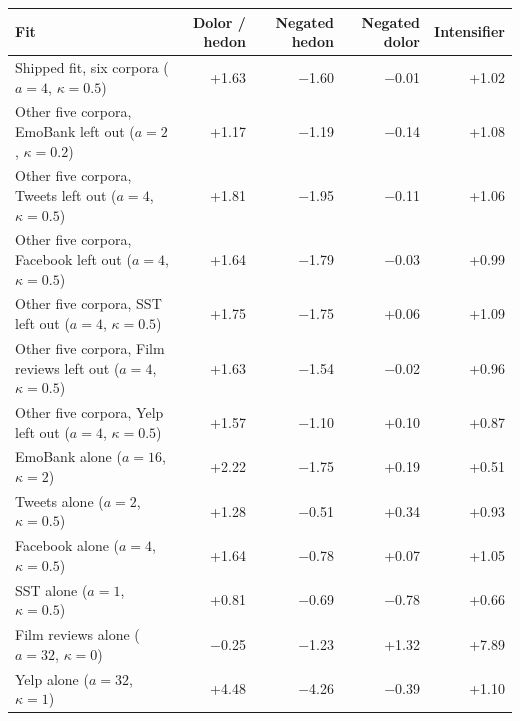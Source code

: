 \begin{tabular}{@{}lrrrr@{}}
\toprule
Fit & Dolor / hedon & Negated hedon & Negated dolor & Intensifier \\
\midrule
Shipped fit, six corpora ($a=4$, $\kappa=0.5$) & +1.63 & \ensuremath{-}1.60 & \ensuremath{-}0.01 & +1.02 \\
\midrule
Other five corpora, EmoBank left out ($a=2$, $\kappa=0.2$) & +1.17 & \ensuremath{-}1.19 & \ensuremath{-}0.14 & +1.08 \\
Other five corpora, Tweets left out ($a=4$, $\kappa=0.5$) & +1.81 & \ensuremath{-}1.95 & \ensuremath{-}0.11 & +1.06 \\
Other five corpora, Facebook left out ($a=4$, $\kappa=0.5$) & +1.64 & \ensuremath{-}1.79 & \ensuremath{-}0.03 & +0.99 \\
Other five corpora, SST left out ($a=4$, $\kappa=0.5$) & +1.75 & \ensuremath{-}1.75 & +0.06 & +1.09 \\
Other five corpora, Film reviews left out ($a=4$, $\kappa=0.5$) & +1.63 & \ensuremath{-}1.54 & \ensuremath{-}0.02 & +0.96 \\
Other five corpora, Yelp left out ($a=4$, $\kappa=0.5$) & +1.57 & \ensuremath{-}1.10 & +0.10 & +0.87 \\
\midrule
EmoBank alone ($a=16$, $\kappa=2$) & +2.22 & \ensuremath{-}1.75 & +0.19 & +0.51 \\
Tweets alone ($a=2$, $\kappa=0.5$) & +1.28 & \ensuremath{-}0.51 & +0.34 & +0.93 \\
Facebook alone ($a=4$, $\kappa=0.5$) & +1.64 & \ensuremath{-}0.78 & +0.07 & +1.05 \\
SST alone ($a=1$, $\kappa=0.5$) & +0.81 & \ensuremath{-}0.69 & \ensuremath{-}0.78 & +0.66 \\
Film reviews alone ($a=32$, $\kappa=0$) & \ensuremath{-}0.25 & \ensuremath{-}1.23 & +1.32 & +7.89 \\
Yelp alone ($a=32$, $\kappa=1$) & +4.48 & \ensuremath{-}4.26 & \ensuremath{-}0.39 & +1.10 \\
\bottomrule
\end{tabular}
